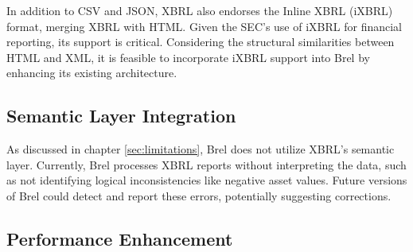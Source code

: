 In addition to CSV and JSON, XBRL also endorses the Inline XBRL (iXBRL) format, merging XBRL with HTML.
Given the SEC's use of iXBRL for financial reporting, its support is critical.
Considering the structural similarities between HTML and XML, it is feasible to incorporate iXBRL support into Brel by enhancing its existing architecture.



\subsection{Semantic Layer Integration}

As discussed in chapter \ref{sec:limitations}, Brel does not utilize XBRL's semantic layer.
Currently, Brel processes XBRL reports without interpreting the data, such as not identifying logical inconsistencies like negative asset values.
Future versions of Brel could detect and report these errors, potentially suggesting corrections.



\subsection{Performance Enhancement}

